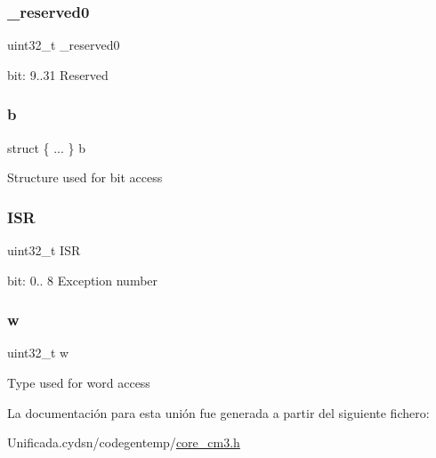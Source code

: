 \subsubsection{\texorpdfstring{\+\_\+reserved0}{\_reserved0}}
{\footnotesize\ttfamily uint32\+\_\+t \+\_\+reserved0}

bit\+: 9..31 Reserved \mbox{\label{union_i_p_s_r___type_a3758147356a15906221a5625a27d9048}} 
\subsubsection{\texorpdfstring{b}{b}}
{\footnotesize\ttfamily struct \{ ... \}   b}

Structure used for bit access \mbox{\label{union_i_p_s_r___type_ad502ba7dbb2aab5f87c782b28f02622d}} 
\subsubsection{\texorpdfstring{I\+SR}{ISR}}
{\footnotesize\ttfamily uint32\+\_\+t I\+SR}

bit\+: 0.. 8 Exception number \mbox{\label{union_i_p_s_r___type_ad0fb62e7a08e70fc5e0a76b67809f84b}} 
\subsubsection{\texorpdfstring{w}{w}}
{\footnotesize\ttfamily uint32\+\_\+t w}

Type used for word access 

La documentación para esta unión fue generada a partir del siguiente fichero\+:\begin{DoxyCompactItemize}
\item 
Unificada.\+cydsn/codegentemp/\mbox{\hyperlink{core__cm3_8h}{core\+\_\+cm3.\+h}}\end{DoxyCompactItemize}
